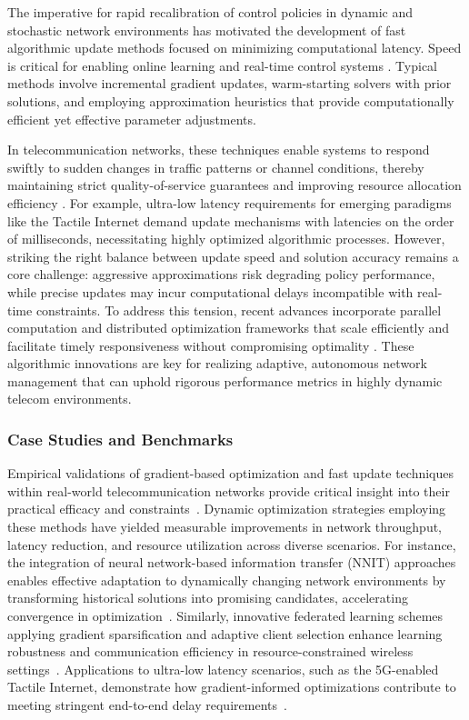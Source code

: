\documentclass[sigconf]{acmart}
\begin{document}
The imperative for rapid recalibration of control policies in dynamic and stochastic network environments has motivated the development of fast algorithmic update methods focused on minimizing computational latency. Speed is critical for enabling online learning and real-time control systems \cite{ref2,ref3,ref6,ref8,ref9,ref11,ref15,ref16}. Typical methods involve incremental gradient updates, warm-starting solvers with prior solutions, and employing approximation heuristics that provide computationally efficient yet effective parameter adjustments.

In telecommunication networks, these techniques enable systems to respond swiftly to sudden changes in traffic patterns or channel conditions, thereby maintaining strict quality-of-service guarantees and improving resource allocation efficiency \cite{ref10}. For example, ultra-low latency requirements for emerging paradigms like the Tactile Internet demand update mechanisms with latencies on the order of milliseconds, necessitating highly optimized algorithmic processes. However, striking the right balance between update speed and solution accuracy remains a core challenge: aggressive approximations risk degrading policy performance, while precise updates may incur computational delays incompatible with real-time constraints. To address this tension, recent advances incorporate parallel computation and distributed optimization frameworks that scale efficiently and facilitate timely responsiveness without compromising optimality \cite{ref11,ref6}. These algorithmic innovations are key for realizing adaptive, autonomous network management that can uphold rigorous performance metrics in highly dynamic telecom environments.

\subsubsection{Case Studies and Benchmarks}

Empirical validations of gradient-based optimization and fast update techniques within real-world telecommunication networks provide critical insight into their practical efficacy and constraints~\cite{ref1,ref4,ref10,ref37,ref47}. Dynamic optimization strategies employing these methods have yielded measurable improvements in network throughput, latency reduction, and resource utilization across diverse scenarios. For instance, the integration of neural network-based information transfer (NNIT) approaches enables effective adaptation to dynamically changing network environments by transforming historical solutions into promising candidates, accelerating convergence in optimization~\cite{ref47}. Similarly, innovative federated learning schemes applying gradient sparsification and adaptive client selection enhance learning robustness and communication efficiency in resource-constrained wireless settings~\cite{ref4}. Applications to ultra-low latency scenarios, such as the 5G-enabled Tactile Internet, demonstrate how gradient-informed optimizations contribute to meeting stringent end-to-end delay requirements~\cite{ref10}. 
\end{document}
